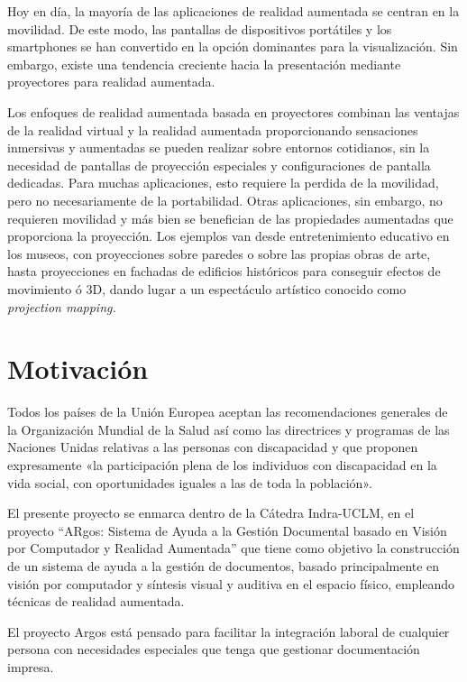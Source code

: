 Hoy en día, la mayoría de las aplicaciones de realidad aumentada se centran en la movilidad. De este modo, las pantallas de dispositivos portátiles y los smartphones se han convertido en la opción dominantes para la visualización. Sin embargo, existe una tendencia creciente hacia la presentación mediante proyectores para realidad aumentada. 

Los enfoques de realidad aumentada basada en proyectores combinan las ventajas de la realidad virtual y la realidad aumentada proporcionando sensaciones inmersivas y aumentadas se pueden realizar sobre entornos cotidianos, sin la necesidad de pantallas de proyección especiales y configuraciones de pantalla dedicadas. Para muchas aplicaciones, esto requiere la perdida de la movilidad, pero no necesariamente de la portabilidad. Otras aplicaciones, sin embargo, no requieren movilidad y más bien se benefician de las propiedades aumentadas que proporciona la proyección. Los ejemplos van desde entretenimiento educativo en los museos, con proyecciones sobre paredes o sobre las propias obras de arte, hasta proyecciones en fachadas de edificios históricos para conseguir efectos de movimiento ó 3D, dando lugar a un espectáculo artístico conocido como \emph{projection mapping.}

\section{Motivación}
Todos los países de la Unión Europea aceptan las recomendaciones generales de la Organización Mundial de la Salud así como las directrices y programas de las Naciones Unidas relativas a las personas con discapacidad y que proponen expresamente «la participación plena de los individuos con discapacidad en la vida social, con oportunidades iguales a las de toda la población». 
 
El presente proyecto se enmarca dentro de la Cátedra Indra-UCLM, en el proyecto “ARgos: Sistema de Ayuda a la Gestión Documental basado en Visión por Computador y Realidad Aumentada” que tiene como objetivo la construcción de un sistema de ayuda a la gestión de documentos, basado principalmente en visión por computador y síntesis visual y auditiva en el espacio físico, empleando técnicas de realidad aumentada. 

El proyecto Argos está pensado para facilitar la integración laboral de cualquier persona con necesidades especiales que tenga que gestionar documentación impresa. 
  
